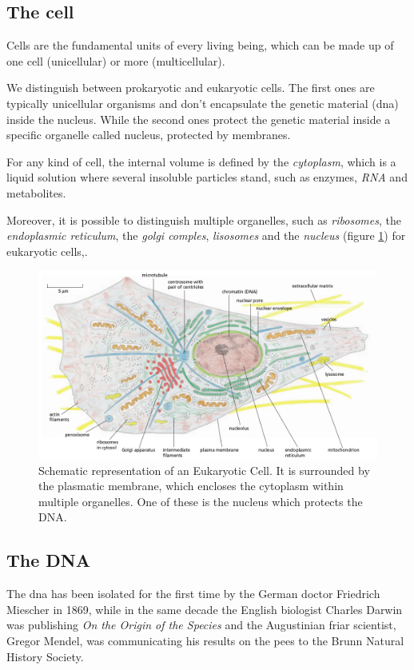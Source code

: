 \subsection{The cell}
\label{sec:cell}
Cells are the fundamental units of every living being, which can be made up of one cell (unicellular) or more (multicellular).

We distinguish between prokaryotic and eukaryotic cells. 
The first ones are typically unicellular organisms and don't encapsulate the genetic material (\gls{dna}) inside the nucleus.
While the second ones protect the genetic material inside a specific organelle called nucleus, protected by membranes.

For any kind of cell, the internal volume is defined by the \textit{cytoplasm}, which is a liquid solution where several insoluble particles stand, such as enzymes, \textit{RNA} and metabolites.

Moreover, it is possible to distinguish multiple organelles, such as \textit{ribosomes}, the \textit{endoplasmic reticulum}, the \textit{golgi comples}, \textit{lisosomes} and the \textit{nucleus} (figure \ref{fig:cell}) for eukaryotic cells,.

\begin{figure}[h]
\centering
\includegraphics[width=\textwidth, keepaspectratio]{img/intro/cell.png}
\caption[The Cell]{Schematic representation of an Eukaryotic Cell. 
It is surrounded by the plasmatic membrane, which encloses the cytoplasm within multiple organelles. 
One of these is the nucleus which protects the DNA.}
\label{fig:cell}
\end{figure}

\subsection{The DNA}
\label{sec:genica}
The \gls{dna} has been isolated for the first time by the German doctor Friedrich Miescher in 1869, while in the same decade the English biologist Charles Darwin was publishing \textit{On the Origin of the Species} and the  Augustinian friar scientist, Gregor Mendel, was communicating his results on the pees to the Brunn Natural History Society.

